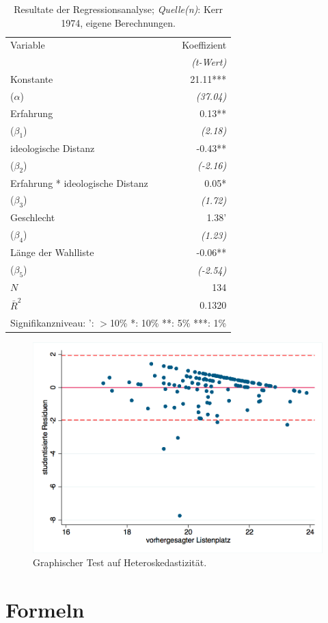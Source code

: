 \documentclass[paper=a4    %
,twoside=false             %
,fontsize=12pt             %
,DIV=11                    %
,parskip=half		   %
]{scrartcl}
\begin{document}
\begin{table}[tb!]
	\begin{center}
		\begin{tabular}{@{}lr@{}}
		\toprule
		Variable 	&	Koeffizient\\ 
		& \emph{(t-Wert)} \\
		\midrule
		Konstante & 21.11*** \\
		($\alpha$) & \emph{(37.04)} \\
		Erfahrung & 0.13**\\ 
		($\beta_{1}$) & \emph{(2.18)}  \\
		ideologische Distanz & -0.43** \\
		($\beta_{2}$) &\emph{(-2.16)}  \\
		Erfahrung * ideologische Distanz & 0.05* \\
		($\beta_{3}$) & \emph{(1.72)}  \\ \hline
		Geschlecht &  1.38'\\
		($\beta_{4}$) &   \emph{(1.23)}  \\
		L\"ange der Wahlliste &   -0.06**\\
		($\beta_{5}$) &  \emph{(-2.54)}  \\ \midrule
		 $N$  & 134\\
		 $\bar R^{2}$ &  0.1320\\ 
		\bottomrule
		\multicolumn{2}{l}{\small{Signifikanzniveau: ': $ >$10\% *: 10\% **: 5\% ***: 1\%}}
		\end{tabular}
		\caption{Resultate der Regressionsanalyse;
		  \textit{Quelle(n)}: Kerr 1974, eigene Berechnungen.}
		\label{reg}
	\end{center}
\end{table}
\begin{figure}[t!]
	\begin{center}
		\includegraphics[width=15cm]{diag1.png}
		\caption{Graphischer Test auf Heteroskedastizit\"at.}
		\label{diag1}
	\end{center}
\end{figure}
\section{Formeln}
\end{document}
